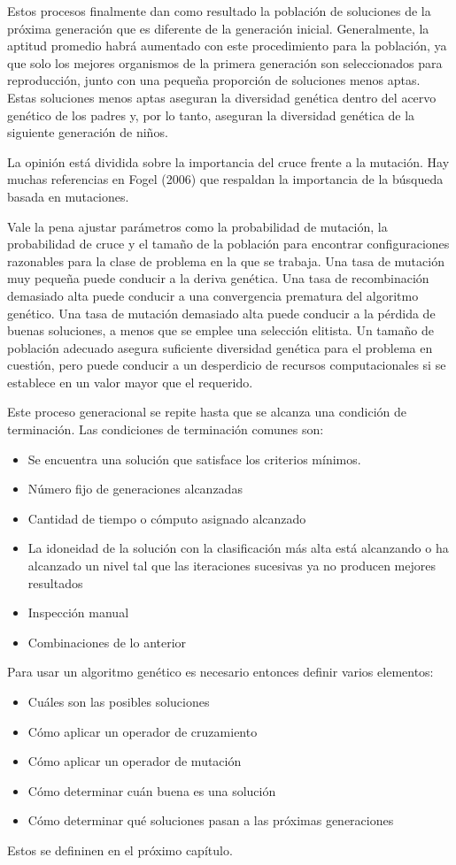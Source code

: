 Estos procesos finalmente dan como resultado la población de soluciones de la próxima generación que es diferente de la generación inicial. Generalmente, la aptitud promedio habrá aumentado con este procedimiento para la población, ya que solo los mejores organismos de la primera generación son seleccionados para reproducción, junto con una pequeña proporción de soluciones menos aptas. Estas soluciones menos aptas aseguran la diversidad genética dentro del acervo genético de los padres y, por lo tanto, aseguran la diversidad genética de la siguiente generación de niños.

La opinión está dividida sobre la importancia del cruce frente a la mutación. Hay muchas referencias en Fogel (2006) que respaldan la importancia de la búsqueda basada en mutaciones.

Vale la pena ajustar parámetros como la probabilidad de mutación, la probabilidad de cruce y el tamaño de la población para encontrar configuraciones razonables para la clase de problema en la que se trabaja. Una tasa de mutación muy pequeña puede conducir a la deriva genética. Una tasa de recombinación demasiado alta puede conducir a una convergencia prematura del algoritmo genético. Una tasa de mutación demasiado alta puede conducir a la pérdida de buenas soluciones, a menos que se emplee una selección elitista. Un tamaño de población adecuado asegura suficiente diversidad genética para el problema en cuestión, pero puede conducir a un desperdicio de recursos computacionales si se establece en un valor mayor que el requerido.

Este proceso generacional se repite hasta que se alcanza una condición de terminación. Las condiciones de terminación comunes son:

\begin{itemize}
    \item Se encuentra una solución que satisface los criterios mínimos.
    \item Número fijo de generaciones alcanzadas
    \item Cantidad de tiempo o cómputo asignado alcanzado
    \item La idoneidad de la solución con la clasificación más alta está alcanzando o ha alcanzado un nivel tal que las iteraciones sucesivas ya no producen mejores resultados
    \item Inspección manual
    \item Combinaciones de lo anterior
\end{itemize}

Para usar un algoritmo genético es necesario entonces definir varios elementos:

\begin{itemize}
    \item Cuáles son las posibles soluciones
    \item Cómo aplicar un operador de cruzamiento
    \item Cómo aplicar un operador de mutación
    \item Cómo determinar cuán buena es una solución
    \item Cómo determinar qué soluciones pasan a las próximas generaciones
\end{itemize}

Estos se defininen en el próximo capítulo.
